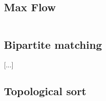 \subsection{Max Flow}
\inputminted[frame=single,framesep=3pt,breaklines=true,tabsize=2,linenos,label=O($V^2 E$)]{c++}{graph/max-flow.cpp}

\subsection{Bipartite matching}
[...]

\subsection{Topological sort}
\inputminted[frame=single,framesep=3pt,breaklines=true,tabsize=2,linenos,label=O(E+V)]{c++}{graph/topo-sort.cpp}